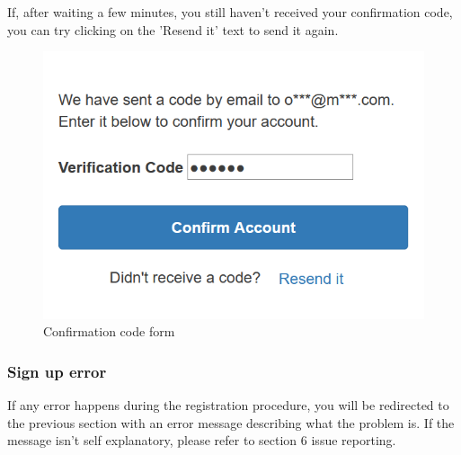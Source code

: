 If, after waiting a few minutes, you still haven't received your confirmation code, you can try clicking on the 'Resend it' text to send it again.

\begin{figure}[H]
\centering
\includegraphics[scale=0.6]{res/Immagini/RegisterCode}
\caption{Confirmation code form}
\end{figure}

\subsubsection{Sign up error}
If any error happens during the registration procedure, you will be redirected to the previous section with an error message describing what the problem is. If the message isn't self explanatory, please refer to section 6 issue reporting.

